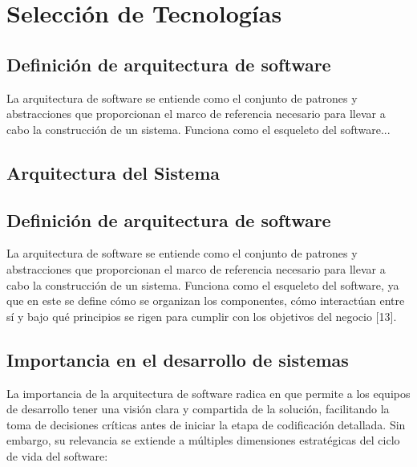 \section{Selección de Tecnologías}


\subsection{Definición de arquitectura de software}
La arquitectura de software se entiende como el conjunto de patrones y abstracciones que proporcionan el marco de referencia necesario para llevar a cabo la construcción de un sistema. Funciona como el esqueleto del software...

\subsection{Arquitectura del Sistema}

\begin{flushleft}
\section{Definición de arquitectura de software}
\end{flushleft}
\justifying
La arquitectura de software se entiende como el conjunto de patrones y abstracciones que proporcionan el marco de referencia necesario para llevar a cabo la construcción de un sistema. Funciona como el esqueleto del software, ya que en este se define cómo se organizan los componentes, cómo interactúan entre sí y bajo qué principios se rigen para cumplir con los objetivos del negocio [13]. 
\subsection{Importancia en el desarrollo de sistemas}

La importancia de la arquitectura de software radica en que permite a los equipos de desarrollo tener una visión clara y compartida de la solución, facilitando la toma de decisiones críticas antes de iniciar la etapa de codificación detallada. Sin embargo, su relevancia se extiende a múltiples dimensiones estratégicas del ciclo de vida del software:

